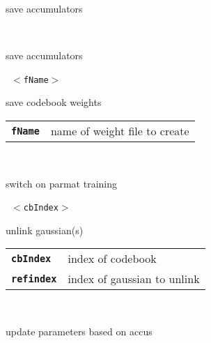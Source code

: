 \begin{description}
\begin{description}
        save accumulators

       \texttt{} \

        save accumulators

       \texttt{ $<$fName$>$} \

        save codebook weights

      \begin{tabular}{ll}
 \texttt{\textbf{fName}} &  name of weight file to create  \\
      \end{tabular}
       \texttt{} \

        switch on parmat training

       \texttt{ $<$cbIndex$>$ } \

        unlink gaussian(s)

      \begin{tabular}{ll}
 \texttt{\textbf{cbIndex}} &  index of codebook  \\
 \texttt{\textbf{refindex}} &  index of gaussian to unlink   \\
      \end{tabular}
       \texttt{} \

        update parameters based on accus

    \end{description}

\end{description}

